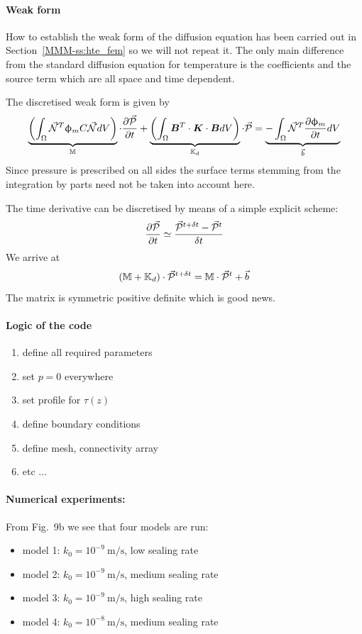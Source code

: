 \paragraph{Weak form}

How to establish the weak form of the diffusion equation has been 
carried out in Section~\ref{MMM-ss:hte_fem} so we will not repeat it. 
The only main difference from the standard diffusion equation for temperature
is the coefficients and the source term which are all space and time dependent.

The discretised weak form is given by
\[
\underbrace{
\left( \int_\Omega \vec{{\mathcal{N}}}^T \upphi_m C  \vec{{\mathcal{N}}} dV  \right)
}_{{\mathbb{M}}}
 \cdot \frac{\partial \vec{\cal P}}{\partial t}
+
\underbrace{
\left( \int_\Omega {\bm B}^T \cdot  {\bm K} \cdot {\bm B} dV \right)
}_{{{\mathbb{K}}}_d}
 \cdot \vec{\cal P}
=
\underbrace{
-
\int_\Omega \vec{{\mathcal{N}}}^T  \frac{\partial \upphi_m}{\partial t} dV
}_{\vec{b}}
\]
Since pressure is prescribed on all sides the surface terms stemming from the integration by parts
need not be taken into account here.

The time derivative can be discretised by means of a simple explicit scheme:
\[
\frac{\partial \vec{\cal P}}{\partial t} \simeq
\frac{ \vec{\cal P}^{t+\delta t} - \vec{\cal P}^t  }{\delta t}
\]
We arrive at 
\[
( {{\mathbb{M}}} + {{\mathbb{K}}}_d) \cdot \vec{\cal P}^{t+\delta t} = {{\mathbb{M}}} \cdot \vec{\cal P}^t  + \vec{b}
\]
The matrix is symmetric positive definite which is good news.


\paragraph{Logic of the code}

\begin{enumerate}
\item define all required parameters
\item set $p=0$ everywhere
\item set profile for $\tau(z)$
\item define boundary conditions
\item define mesh, connectivity array
\item etc ...
\end{enumerate}

\paragraph{Numerical experiments:} From Fig.~9b we see that four models are run:
\begin{itemize}
\item model 1: $k_0=10^{-9}~\si{\meter\per\second}$, low sealing rate
\item model 2: $k_0=10^{-9}~\si{\meter\per\second}$, medium sealing rate
\item model 3: $k_0=10^{-9}~\si{\meter\per\second}$, high sealing rate
\item model 4: $k_0=10^{-8}~\si{\meter\per\second}$, medium sealing rate
\end{itemize}



